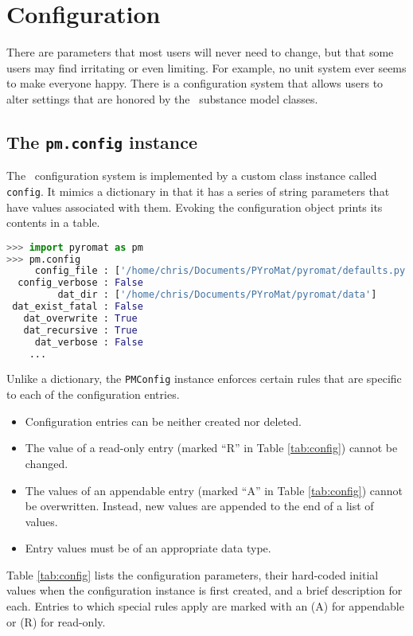 \chapter{Configuration}\label{ch:config}

There are parameters that most users will never need to change, but that some users may find irritating or even limiting.  For example, no unit system ever seems to make everyone happy.  There is a configuration system that allows users to alter settings that are honored by the \PM\ substance model classes.

\section{The \texttt{pm.config} instance}

The \PM\ configuration system is implemented by a custom class instance called \texttt{config}.  It mimics a dictionary in that it has a series of string parameters that have values associated with them.  Evoking the configuration object prints its contents in a table.
\begin{lstlisting}[language=Python]
>>> import pyromat as pm
>>> pm.config
     config_file : ['/home/chris/Documents/PYroMat/pyromat/defaults.py']
  config_verbose : False
         dat_dir : ['/home/chris/Documents/PYroMat/pyromat/data']
 dat_exist_fatal : False
   dat_overwrite : True
   dat_recursive : True
     dat_verbose : False
    ...
\end{lstlisting}

Unlike a dictionary, the \texttt{PMConfig} instance enforces certain rules that are specific to each of the configuration entries.
\begin{itemize}
\item Configuration entries can be neither created nor deleted.
\item The value of a read-only entry (marked ``R'' in Table \ref{tab:config}) cannot be changed.
\item The values of an appendable entry (marked ``A'' in Table \ref{tab:config}) cannot be overwritten.  Instead, new values are appended to the end of a list of values.
\item Entry values must be of an appropriate data type.
\end{itemize}

Table \ref{tab:config} lists the configuration parameters, their hard-coded initial values when the configuration instance is first created, and a brief description for each.  Entries to which special rules apply are marked with an (A) for appendable or (R) for read-only.

